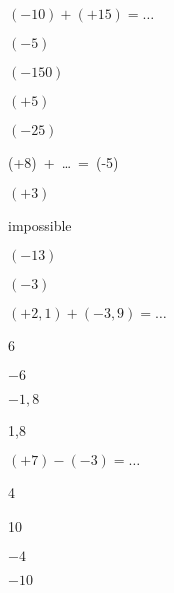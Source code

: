


\begin{QCM}
  \begin{GroupeQCM}
    \begin{exercice}
      $(-10) + (+15) = \ldots$
      \begin{ChoixQCM}{4}
      \item $(-5)$
      \item $(-150)$
      \item $(+5)$
      \item $(-25)$
      \end{ChoixQCM}
\begin{corrige}
   \end{corrige}
    \end{exercice}
    
    
    \begin{exercice}
      (+8) + \ldots = (-5)
      \begin{ChoixQCM}{4}
      \item $(+3)$
      \item impossible
      \item $(-13)$
      \item $(-3)$
      \end{ChoixQCM}
\begin{corrige}
   \end{corrige}
    \end{exercice}
    
    
    \begin{exercice}
      $(+2,1) + (-3,9) = \ldots$
      \begin{ChoixQCM}{4}
      \item 6
      \item $-6$
      \item $-1,8$
      \item 1,8
      \end{ChoixQCM}
\begin{corrige}
   \end{corrige}
    \end{exercice}
    
    
    \begin{exercice}
      $(+7) - (-3) = \ldots$
      \begin{ChoixQCM}{4}
      \item 4
      \item 10
      \item $-4$
      \item $-10$
      \end{ChoixQCM}
\begin{corrige}
   \end{corrige}
    \end{exercice}
    

\end{GroupeQCM}
\end{QCM}
